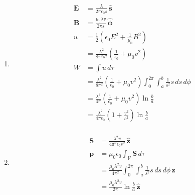 \documentclass{article}
\renewcommand{\vec}[1]{\boldsymbol{\mathbf{#1}}}
\newcommand{\uvec}[1]{\hat{\vec{#1}}}
\begin{document}
\subsection{}

\begin{enumerate}
  \item

        \begin{align*}
          \vec{E} & = \frac{\lambda}{2 \pi \epsilon_0 s} \,\uvec{s}                                                                                    \\
          \vec{B} & = \frac{\mu_0 \lambda v}{2 \pi s} \,\uvec{\phi}                                                                                    \\
          u       & = \frac{1}{2} \left( \epsilon_0 E^2 + \frac{1}{\mu_0} B^2 \right)                                                                  \\
                  & = \frac{\lambda^2}{8 \pi^2 s^2} \left( \frac{1}{\epsilon_0} + \mu_0 v^2 \right)                                                    \\
          W       & = \int u \,d \tau                                                                                                                  \\
                  & = \frac{\lambda^2}{8 \pi^2} \left( \frac{1}{\epsilon_0} + \mu_0 v^2 \right) \int_0^{2 \pi} \int_a^b \frac{1}{s^2} s \,d s \,d \phi \\
                  & = \frac{\lambda^2}{4 \pi} \left( \frac{1}{\epsilon_0} + \mu_0 v^2 \right) \ln \frac{b}{a}                                          \\
                  & = \frac{\lambda^2}{4 \pi \epsilon_0} \left( 1 + \frac{v^2}{c^2} \right) \ln \frac{b}{a}                                            \\
        \end{align*}

  \item

        \begin{align*}
          \vec{S} & = \frac{\lambda^2 v}{4 \pi^2 \epsilon_0 s^2} \,\uvec{z}                                               \\
          \vec{p} & = \mu_0 \epsilon_0 \int_\mathcal{V} \vec{S} \,d \tau                                                  \\
                  & = \frac{\mu_0 \lambda^2 v}{4 \pi^2} \int_0^{2 \pi} \int_a^b \frac{1}{s^2} s \,d s \,d \phi \,\uvec{z} \\
                  & = \frac{\mu_0 \lambda^2 v}{2 \pi} \ln \frac{b}{a} \,\uvec{z}
        \end{align*}


\end{enumerate}
\end{document}
